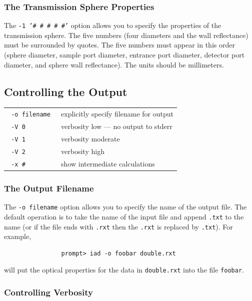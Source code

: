 \documentclass{article}
\begin{document}
\subsubsection{The Transmission Sphere Properties}
The \texttt{-1 '\# \# \# \# \#'} option allows you to specify the properties
of the transmission sphere. The five numbers (four diameters and the wall reflectance)
must be surrounded by quotes.  The 
five numbers must appear in this order (sphere diameter, sample port diameter,
entrance port diameter, detector port diameter, and sphere wall reflectance).
The units should be millimeters.
\clearpage


\subsection{Controlling the Output}
\begin{center}
\begin{tabular}{lp{7cm}}
\texttt{ -o filename         }& explicitly specify filename for output     \\
\texttt{ -V 0                }& verbosity low --- no output to stderr      \\
\texttt{ -V 1                }& verbosity moderate                         \\
\texttt{ -V 2                }& verbosity high                             \\
\texttt{ -x \#               }& show intermediate calculations             \\
\end{tabular}
\end{center}

\subsubsection{The Output Filename}

The \texttt{-o filename} option allows you to specify the name of the output
file.  The default operation is to take the name of the input file and append
\texttt{.txt} to the name (or if the file ends with \texttt{.rxt} then
the \texttt{.rxt} is replaced by \texttt{.txt}).  For example,
\begin{verbatim}
                prompt> iad -o foobar double.rxt
\end{verbatim}
will put the optical properties for the data in \texttt{double.rxt}
 into the file \texttt{foobar}.

\subsubsection{Controlling Verbosity}
\end{document}
